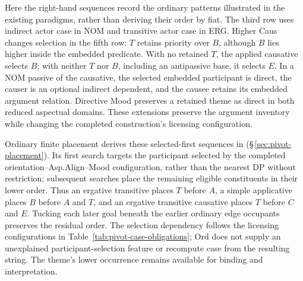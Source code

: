 Here the right-hand sequences record the ordinary patterns illustrated in the
existing paradigms, rather than deriving their order by fiat. The third row
uses indirect actor case in NOM and transitive actor case in ERG. Higher Caus
changes selection in the fifth row: $T$ retains priority over $B$, although
$B$ lies higher inside the embedded predicate. With no retained $T$, the
applied causative selects $B$; with neither $T$ nor $B$, including an
antipassive base, it selects $E$. In a NOM passive of the causative, the
selected embedded participant is direct, the causer is an optional indirect
dependent, and the causee retains its embedded argument relation. Directive
Mood preserves a retained theme as direct in both reduced aspectual domains.
These extensions preserve the argument inventory while changing the completed
construction's licensing configuration.

Ordinary finite placement derives these selected-first sequences in
  (§\,\ref{sec:pivot-placement}). Its first search targets the
 participant selected by the completed orientation--Asp.Align--Mood
 configuration, rather than the nearest DP without restriction; subsequent
 searches place the remaining eligible constituents in their lower order.
 Thus an ergative transitive places $T$ before $A$, a simple applicative
 places $B$ before $A$ and $T$, and an ergative transitive causative places
 $T$ before $C$ and $E$. Tucking each later goal beneath the earlier ordinary
 edge occupants preserves the residual order. The selection dependency
 follows the licensing configurations in
 Table~\ref{tab:pivot-case-obligations}; Ord does not supply an unexplained
 participant-selection feature or recompute case from the resulting string.
 The theme's lower occurrence remains available for binding and interpretation.

